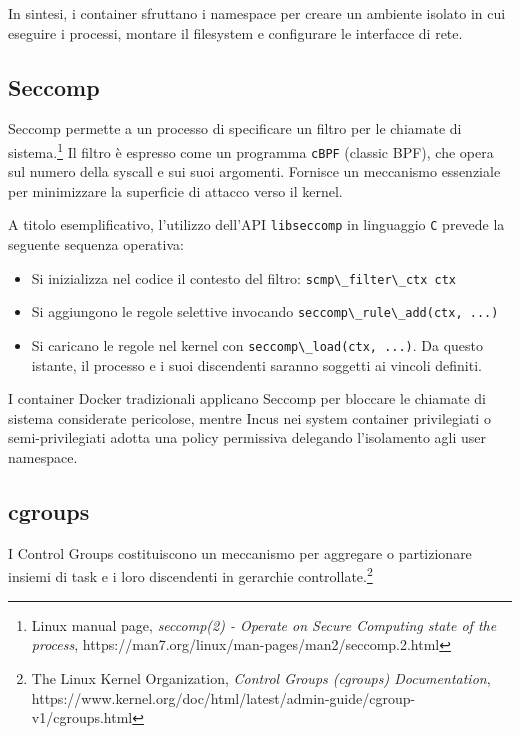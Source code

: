In sintesi, i container sfruttano i namespace per creare un ambiente
isolato in cui eseguire i processi, montare il filesystem e configurare
le interfacce di rete.

\subsection{Seccomp}\label{seccomp}

Seccomp permette a un processo di specificare un filtro per le chiamate
di sistema.\footnote{\label{fn:ref_33}Linux manual page, \emph{seccomp(2) - Operate on
  Secure Computing state of the process},
  https://man7.org/linux/man-pages/man2/seccomp.2.html} Il filtro è
espresso come un programma \passthrough{\lstinline!cBPF!} (classic BPF),
che opera sul numero della syscall e sui suoi argomenti. Fornisce un
meccanismo essenziale per minimizzare la superficie di attacco verso il
kernel.

A titolo esemplificativo, l'utilizzo dell'API
\passthrough{\lstinline!libseccomp!} in linguaggio
\passthrough{\lstinline!C!} prevede la seguente sequenza operativa:

\begin{itemize}
\tightlist
\item
  Si inizializza nel codice il contesto del filtro:
  \passthrough{\lstinline!scmp\_filter\_ctx ctx!}
\item
  Si aggiungono le regole selettive invocando
  \passthrough{\lstinline!seccomp\_rule\_add(ctx, ...)!}
\item
  Si caricano le regole nel kernel con
  \passthrough{\lstinline!seccomp\_load(ctx, ...)!}. Da questo istante,
  il processo e i suoi discendenti saranno soggetti ai vincoli definiti.
\end{itemize}

I container Docker tradizionali applicano Seccomp per bloccare le
chiamate di sistema considerate pericolose, mentre Incus nei system
container privilegiati o semi-privilegiati adotta una policy permissiva
delegando l'isolamento agli user namespace.

\subsection{cgroups}\label{cgroups}

I Control Groups costituiscono un meccanismo per aggregare o
partizionare insiemi di task e i loro discendenti in gerarchie
controllate.\footnote{\label{fn:ref_34}The Linux Kernel Organization, \emph{Control
  Groups (cgroups) Documentation},
  https://www.kernel.org/doc/html/latest/admin-guide/cgroup-v1/cgroups.html}

